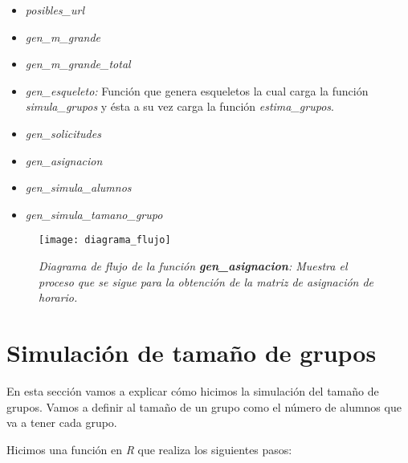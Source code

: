 \begin{itemize}
\item \textit{posibles\_url}

\item \textit{gen\_m\_grande}

\item \textit{gen\_m\_grande\_total}

\item \textit{gen\_esqueleto: } Función que genera esqueletos la cual carga la función \textit{simula\_grupos} y ésta a su vez carga la función \textit{estima\_grupos}.

\item \textit{gen\_solicitudes}

\item \textit{gen\_asignacion}

\item \textit{gen\_simula\_alumnos}

\item \textit{gen\_simula\_tamano\_grupo}
\end{itemize}

\begin{figure}[H]
\centering
\texttt{[image: diagrama\_flujo]} %
\caption[\textit{Diagrama de flujo de la función \textbf{gen\_asignacion}}]{\textit{Diagrama de flujo de la función \textbf{gen\_asignacion}: Muestra el proceso que se sigue para la obtención de la matriz de asignación de horario.}}\label{DF_genAsig}
\end{figure}



\section{Simulación de tamaño de grupos} \label{SimTamGpos}

En esta sección vamos a explicar cómo hicimos la simulación del tamaño de grupos. Vamos a definir al tamaño de un grupo como el número de alumnos que va a tener cada grupo.

Hicimos una función en \textit{R} que realiza los siguientes pasos:
  
